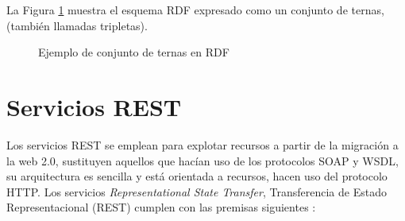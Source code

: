 La Figura \ref{ejemploRDF} muestra el esquema RDF expresado como un conjunto de ternas, (tambi\'en llamadas tripletas).\newline

\begin{figure}[!ht]
    \centering
    \caption{Ejemplo de conjunto de ternas en RDF} %
    \label{ejemploRDF}
\end{figure}

    
\section{Servicios REST}

Los servicios REST se emplean para explotar recursos a partir de la migraci\'on a la web 2.0, sustituyen aquellos que hac\'ian uso de los protocolos SOAP y WSDL, su arquitectura es sencilla y est\'a orientada a recursos, hacen uso del protocolo HTTP. Los servicios \textit{Re\-pre\-sen\-ta\-tio\-nal State Transfer}, Transferencia de Estado Representacional (REST) cumplen con las premisas siguientes \cite{FeaturesREST}:

